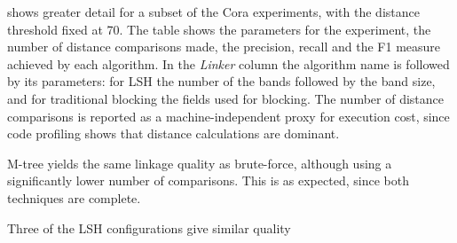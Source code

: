 \documentclass{llncs}
\begin{document}
 shows greater detail for a subset of
the Cora experiments, with the distance threshold fixed at 70. The table
shows the parameters for the experiment, the number of distance
comparisons made, the precision, recall and the F1 measure achieved by
each algorithm.  In the \emph{Linker} column the algorithm name is
followed by its parameters: for LSH the number of the bands followed by
the band size, and for traditional blocking the fields used for
blocking. The number of distance comparisons is reported as a
machine-independent proxy for execution cost, since code profiling shows
that distance calculations are dominant.

M-tree yields the same linkage quality as brute-force, although using a significantly lower
number of comparisons. This is as expected, since both techniques are complete.

Three of the LSH configurations give similar quality
\end{document}
